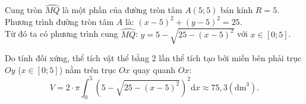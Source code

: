 \begin{ex}
{\begin{center}
		\end{center}
		Cung tròn $\wideparen{MQ}$ là một phần của đường tròn tâm $A(5; 5)$ bán kính $R=5$. \\
		Phương trình đường tròn tâm $A$ là: $(x-5)^2 + (y-5)^2 = 25$. \\
		Từ đó ta có phương trình cung $\wideparen{MQ}$: $y = 5 - \sqrt{25 - (x - 5)^2}$ với $x \in [0; 5]$. 
		
		Do tính đối xứng, thể tích vật thể bằng 2 lần thể tích tạo bởi miền bên phải trục $Oy$ ($x \in [0; 5]$) nằm trên trục $Ox$ quay quanh $Ox$:
		$$V = 2 \cdot \pi \displaystyle\int_{0}^{5} \left( 5 - \sqrt{25 - (x-5)^2} \right)^2 \mathrm{d}x \approx 75{,}3  (\text{dm}^3).$$
		
	}
\end{ex}
